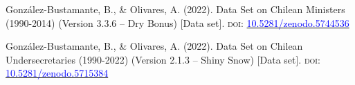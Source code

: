 





\begin{publications}

\begin{benumerate}{2}

\item{\small Gonz\'alez-Bustamante, B., \& Olivares, A. (2022). Data Set on Chilean Ministers (1990-2014) (Version 3.3.6 -- Dry Bonus) [Data set]. {\scshape doi:} \href{https://doi.org/10.5281/zenodo.5744536}{\textcolor{blue}{10.5281/zenodo.5744536}}}\vspace{1mm}

\item{Gonz\'alez-Bustamante, B., \& Olivares, A. (2022). Data Set on Chilean Undersecretaries (1990-2022) (Version 2.1.3 -- Shiny Snow) [Data set]. {\scshape doi:} \href{https://doi.org/10.5281/zenodo.5715384}{\textcolor{blue}{10.5281/zenodo.5715384}}}\vspace{1mm}

\end{benumerate}

\end{publications}



